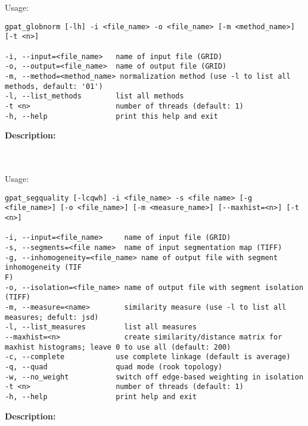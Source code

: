 {}
\\\\
Usage:

\begin{minipage}{\linewidth}
\begin{lstlisting}
gpat_globnorm [-lh] -i <file_name> -o <file_name> [-m <method_name>] [-t <n>]

-i, --input=<file_name>   name of input file (GRID)
-o, --output=<file_name>  name of output file (GRID)
-m, --method=<method_name> normalization method (use -l to list all methods, default: '01')
-l, --list_methods        list all methods
-t <n>                    number of threads (default: 1)
-h, --help                print this help and exit
\end{lstlisting}
\end{minipage}






{\bf Description:}

{}
\\\\
Usage:

\begin{minipage}{\linewidth}
\begin{lstlisting}
gpat_segquality [-lcqwh] -i <file_name> -s <file name> [-g <file_name>] [-o <file_name>] [-m <measure_name>] [--maxhist=<n>] [-t <n>]

-i, --input=<file_name>     name of input file (GRID)
-s, --segments=<file name>  name of input segmentation map (TIFF)
-g, --inhomogeneity=<file_name> name of output file with segment inhomogeneity (TIF
F)
-o, --isolation=<file_name> name of output file with segment isolation (TIFF)
-m, --measure=<name>        similarity measure (use -l to list all measures; defult: jsd)
-l, --list_measures         list all measures
--maxhist=<n>               create similarity/distance matrix for maxhist histograms; leave 0 to use all (default: 200)
-c, --complete            use complete linkage (default is average)
-q, --quad                quad mode (rook topology)
-w, --no_weight           switch off edge-based weighting in isolation
-t <n>                    number of threads (default: 1)
-h, --help                print help and exit
\end{lstlisting}
\end{minipage}












{\bf Description:}